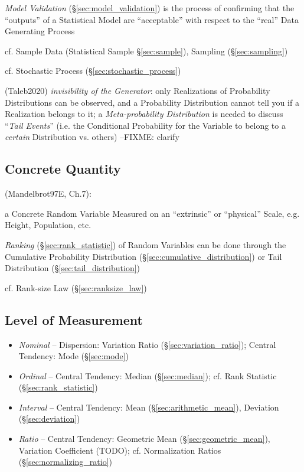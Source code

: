 \fist \emph{Model Validation} (\S\ref{sec:model_validation}) is the process of
confirming that the ``outputs'' of a Statistical Model are ``acceptable'' with
respect to the ``real'' Data Generating Process

\fist cf. Sample Data (Statistical Sample \S\ref{sec:sample}), Sampling
(\S\ref{sec:sampling})

\fist cf. Stochastic Process (\S\ref{sec:stochastic_process})

(Taleb2020) \emph{invisibility of the Generator}: only Realizations of
Probability Distributions can be observed, and a Probability Distribution cannot
tell you if a Realization belongs to it; a \emph{Meta-probability Distribution}
is needed to discuss ``\emph{Tail Events}'' (i.e. the Conditional Probability
for the Variable to belong to a \emph{certain} Distribution vs. others) --FIXME:
clarify



\subsection{Concrete Quantity}\label{sec:concrete_quantity}

(Mandelbrot97E, Ch.7):

a Concrete Random Variable Measured on an ``extrinsic'' or ``physical'' Scale,
e.g. Height, Population, etc.

\emph{Ranking} (\S\ref{sec:rank_statistic}) of Random Variables can be done
through the Cumulative Probability Distribution
(\S\ref{sec:cumulative_distribution}) or Tail Distribution
(\S\ref{sec:tail_distribution})

cf. Rank-size Law (\S\ref{sec:ranksize_law})



\subsection{Level of Measurement}\label{sec:measurement_level}

\begin{itemize}
  \item \emph{Nominal} -- Dispersion: Variation Ratio
    (\S\ref{sec:variation_ratio}); Central Tendency: Mode (\S\ref{sec:mode})
  \item \emph{Ordinal} -- Central Tendency: Median (\S\ref{sec:median});
    cf. Rank Statistic (\S\ref{sec:rank_statistic})
  \item \emph{Interval} -- Central Tendency: Mean (\S\ref{sec:arithmetic_mean}),
    Deviation (\S\ref{sec:deviation})
  \item \emph{Ratio} -- Central Tendency: Geometric Mean
    (\S\ref{sec:geometric_mean}), Variation Coefficient (TODO);
    cf. Normalization Ratios (\S\ref{sec:normalizing_ratio})
\end{itemize}



